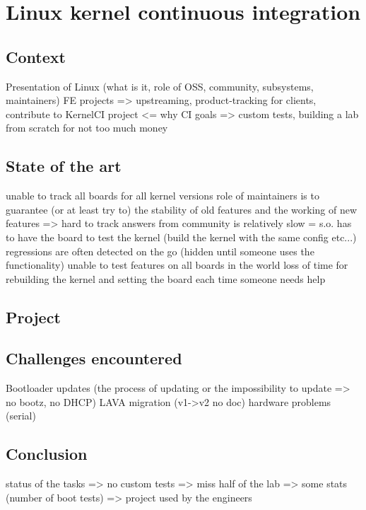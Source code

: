 \chapter{Linux kernel continuous integration}
\section{Context}

Presentation of Linux (what is it, role of OSS, community, subsystems, maintainers)
FE projects => upstreaming, product-tracking for clients, contribute to KernelCI project <= why CI
goals => custom tests, building a lab from scratch for not too much money

\section{State of the art}
unable to track all boards for all kernel versions
role of maintainers is to guarantee (or at least try to) the stability of old features and the working of new features => hard to track
answers from community is relatively slow = s.o. has to have the board to test the kernel (build the kernel with the same config etc...)
regressions are often detected on the go (hidden until someone uses the functionality)
unable to test features on all boards in the world
loss of time for rebuilding the kernel and setting the board each time someone needs help

\section{Project}

\section{Challenges encountered}
Bootloader updates (the process of updating or the impossibility to update => no bootz, no DHCP)
LAVA migration (v1->v2 no doc)
hardware problems (serial)

\section{Conclusion}
status of the tasks
=> no custom tests
=> miss half of the lab
=> some stats (number of boot tests)
=> project used by the engineers
